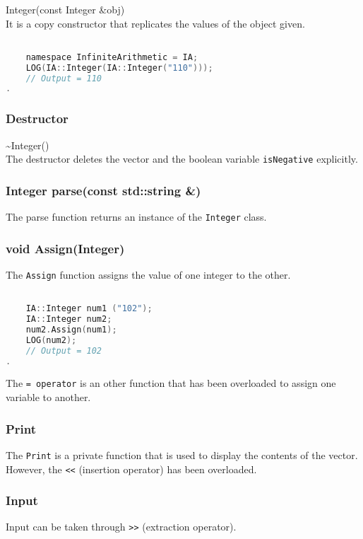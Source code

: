 \noindent
{\ttfamily \large Integer(const Integer \&obj)} \\[2mm]
It is a copy constructor that replicates the values of the object given.
\vspace*{1em}
\begin{lstlisting}[language = C]

	namespace InfiniteArithmetic = IA;
	LOG(IA::Integer(IA::Integer("110")));
	// Output = 110
.
\end{lstlisting}
\vspace*{1em}


\subsubsection{Destructor}
{\ttfamily \large \~{}Integer()} \\[2mm]
The destructor deletes the vector and the boolean variable \verb|isNegative| explicitly.


\subsubsection{Integer parse(const std::string \&)}
The parse function returns an instance of the \verb|Integer| class.


\subsubsection{void Assign(Integer)}
The \verb|Assign| function assigns the value of one integer to the other.
\vspace*{1em}
\begin{lstlisting}[language = C]	

	IA::Integer num1 ("102");
	IA::Integer num2;
	num2.Assign(num1);
	LOG(num2);
	// Output = 102
.
\end{lstlisting}
\vspace*{1em}

The \verb|= operator| is an other function that has been overloaded to assign one variable to another.


\subsubsection{Print}
The \verb|Print| is a private function that is used to display the contents of the vector. \\

However, the \verb|<<| (insertion operator) has been overloaded.
\subsubsection{Input}
Input can be taken through \verb|>>| (extraction operator). 
